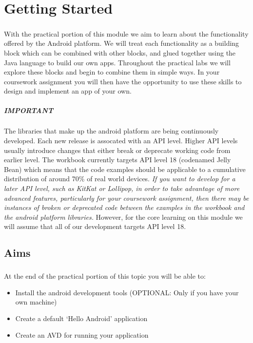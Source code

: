 \chapter{Getting Started}
\label{lab1}
\paragraph{} With the practical portion of this module we aim to learn about the functionality offered by the Android platform. We will treat each functionality as a building block which can be combined with other blocks, and glued together using the Java language to build our own apps. Throughout the practical labs we will explore these blocks and begin to combine them in simple ways. In your coursework assignment you will then have the opportunity to use these skills to design and implement an app of your own.

\begin{framed}
\paragraph{IMPORTANT} The libraries that make up the android platform are being continuously developed. Each new release is assocated with an API level. Higher API levels usually introduce changes that either break or deprecate working code from earlier level. The workbook currently targets API level 18 (codenamed Jelly Bean) which means that the code examples should be applicable to a cumulative distribution of around 70\% of real world devices. \emph{If you want to develop for a later API level, such as KitKat or Lollipop, in order to take advantage of more advanced features, particularly for your coursework assignment, then there may be instances of broken or deprecated code between the examples in the workbook and the android platform libraries.} However, for the core learning on this module we will assume that all of our development targets API level 18.
\end{framed}

\section{Aims}
\paragraph{} At the end of the practical portion of this topic you will be able to:

\begin{itemize}
\item Install the android development tools (OPTIONAL: Only if you have your own machine)
\item Create a default `Hello Android' application
\item Create an AVD for running your application
\end{itemize}


